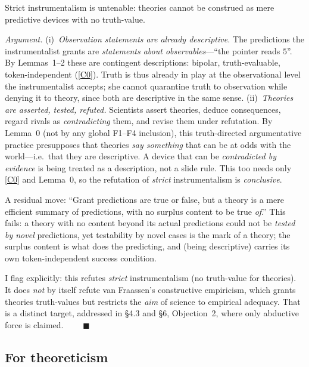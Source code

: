 \documentclass[12pt]{article}
\begin{document}
\begin{description}[leftmargin=1.6em,style=nextline]
\item[Claim 5.] Strict instrumentalism is untenable: theories cannot be
construed as mere predictive devices with no truth-value.
\end{description}

\noindent\emph{Argument.} (i)~\emph{Observation statements are already
descriptive.} The predictions the instrumentalist grants are
\emph{statements about observables}---``the pointer reads $5$''. By
Lemmas~1--2 these are contingent descriptions: bipolar, truth-evaluable,
token-independent (\ref{C0}). Truth is thus already in play at the
observational level the instrumentalist accepts; she cannot quarantine
truth to observation while denying it to theory, since both are
descriptive in the same sense. (ii)~\emph{Theories are asserted, tested,
refuted.} Scientists assert theories, deduce consequences, regard rivals
as \emph{contradicting} them, and revise them under refutation. By
Lemma~0 (not by any global F1--F4 inclusion), this truth-directed
argumentative practice presupposes that theories \emph{say something} that
can be at odds with the world---i.e.\ that they are descriptive. A device
that can be \emph{contradicted by evidence} is being treated as a
description, not a slide rule. This too needs only \ref{C0} and Lemma~0,
so the refutation of \emph{strict} instrumentalism is \emph{conclusive}.

A residual move: ``Grant predictions are true or false, but a theory is a
mere efficient summary of predictions, with no surplus content to be true
\emph{of}.'' This fails: a theory with no content beyond its actual
predictions could not be \emph{tested by novel} predictions, yet
testability by novel cases is the mark of a theory; the surplus content is
what does the predicting, and (being descriptive) carries its own
token-independent success condition.

I flag explicitly: this refutes \emph{strict} instrumentalism (no
truth-value for theories). It does \emph{not} by itself refute van
Fraassen's constructive empiricism, which grants theories truth-values but
restricts the \emph{aim} of science to empirical adequacy. That is a
distinct target, addressed in \S4.3 and \S6, Objection~2, where only
abductive force is claimed.
$\qquad\blacksquare$

\subsection{For theoreticism}
\end{document}
